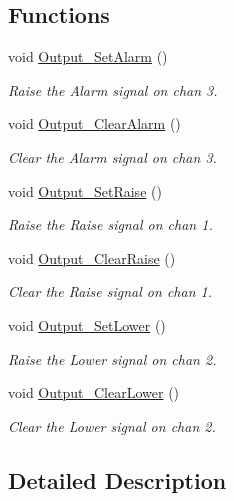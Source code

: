 \subsection*{Functions}
\begin{DoxyCompactItemize}
\item 
void \hyperlink{group___output__module_gad84a7e733dd8fe211239866d1e61c295}{Output\+\_\+\+Set\+Alarm} ()
\begin{DoxyCompactList}\small\item\em Raise the Alarm signal on chan 3. \end{DoxyCompactList}\item 
void \hyperlink{group___output__module_ga896161acb2cf33aad17ee9e30b79124f}{Output\+\_\+\+Clear\+Alarm} ()
\begin{DoxyCompactList}\small\item\em Clear the Alarm signal on chan 3. \end{DoxyCompactList}\item 
void \hyperlink{group___output__module_ga649dc8f6b5ec571b670a51ab11c3d7a4}{Output\+\_\+\+Set\+Raise} ()
\begin{DoxyCompactList}\small\item\em Raise the Raise signal on chan 1. \end{DoxyCompactList}\item 
void \hyperlink{group___output__module_gacaad8af3eb8a2896f6fa4d318963204c}{Output\+\_\+\+Clear\+Raise} ()
\begin{DoxyCompactList}\small\item\em Clear the Raise signal on chan 1. \end{DoxyCompactList}\item 
void \hyperlink{group___output__module_ga389d2bc8458dd440d6047f8372767e12}{Output\+\_\+\+Set\+Lower} ()
\begin{DoxyCompactList}\small\item\em Raise the Lower signal on chan 2. \end{DoxyCompactList}\item 
void \hyperlink{group___output__module_gab2c1e096434d86882fbeafa4ba08fe01}{Output\+\_\+\+Clear\+Lower} ()
\begin{DoxyCompactList}\small\item\em Clear the Lower signal on chan 2. \end{DoxyCompactList}\end{DoxyCompactItemize}


\subsection{Detailed Description}


